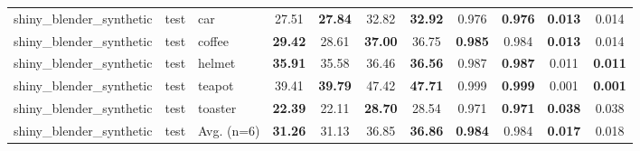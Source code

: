 \begin{table}[t]
{\begin{tabular}{lllcccccccc}
shiny\_blender\_synthetic & test & car & 27.51 & \textbf{27.84} & 32.82 & \textbf{32.92} & 0.976 & \textbf{0.976} & \textbf{0.013} & 0.014 \\
shiny\_blender\_synthetic & test & coffee & \textbf{29.42} & 28.61 & \textbf{37.00} & 36.75 & \textbf{0.985} & 0.984 & \textbf{0.013} & 0.014 \\
shiny\_blender\_synthetic & test & helmet & \textbf{35.91} & 35.58 & 36.46 & \textbf{36.56} & 0.987 & \textbf{0.987} & 0.011 & \textbf{0.011} \\
shiny\_blender\_synthetic & test & teapot & 39.41 & \textbf{39.79} & 47.42 & \textbf{47.71} & 0.999 & \textbf{0.999} & 0.001 & \textbf{0.001} \\
shiny\_blender\_synthetic & test & toaster & \textbf{22.39} & 22.11 & \textbf{28.70} & 28.54 & 0.971 & \textbf{0.971} & \textbf{0.038} & 0.038 \\
shiny\_blender\_synthetic & test & Avg. (n=6) & \textbf{31.26} & 31.13 & 36.85 & \textbf{36.86} & \textbf{0.984} & 0.984 & \textbf{0.017} & 0.018 \\
\bottomrule
\end{tabular}}
\end{table}
